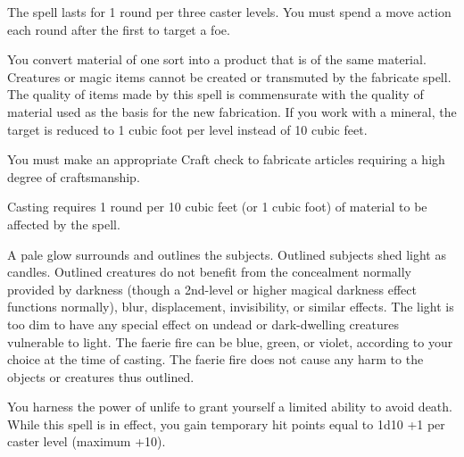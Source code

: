 \begin{multicols}{2}
\begin{small}
\smallskip\noindent The spell lasts for 1 round per three caster levels. You must spend a move action each round after the first to target a foe.

\noindent You convert material of one sort into a product that is of the same material. Creatures or magic items cannot be created or transmuted by the fabricate spell. The quality of items made by this spell is commensurate with the quality of material used as the basis for the new fabrication. If you work with a mineral, the target is reduced to 1 cubic foot per level instead of 10 cubic feet.

\smallskip\noindent You must make an appropriate Craft check to fabricate articles requiring a high degree of craftsmanship.

\smallskip\noindent Casting requires 1 round per 10 cubic feet (or 1 cubic foot) of material to be affected by the spell.


\noindent A pale glow surrounds and outlines the subjects. Outlined subjects shed light as candles. Outlined creatures do not benefit from the concealment normally provided by darkness (though a 2nd-level or higher magical darkness effect functions normally), blur, displacement, invisibility, or similar effects. The light is too dim to have any special effect on undead or dark-dwelling creatures vulnerable to light. The faerie fire can be blue, green, or violet, according to your choice at the time of casting. The faerie fire does not cause any harm to the objects or creatures thus outlined.

\noindent You harness the power of unlife to grant yourself a limited ability to avoid death. While this spell is in effect, you gain temporary hit points equal to 1d10 +1 per caster level (maximum +10).


\end{small}
\end{multicols}
